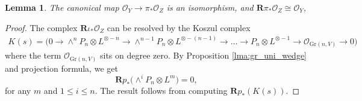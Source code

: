 \documentclass[a4paper]{amsart}
\theoremstyle{plain}
\newtheorem{lemma}[theorem]{Lemma}
\theoremstyle{definition}
\numberwithin{equation}{section}
\newcommand{\Gr}{\mathrm{Gr}}
\newcommand{\SO}{\mathcal{O}}
\begin{document}
\begin{lemma}\label{lma:push-pull-identiy-2}
    The canonical map $\SO_Y \to \pi_*\SO_{Z}$ is an isomorphism, and $\mathbf{R}\pi_* \SO_Z \cong \SO_Y$,
\end{lemma}
\begin{proof} The complex $\mathbf{R}\iota_* \SO_Z$ can be resolved by the Koszul complex
    \[
        \begin{aligned}
            K(s)	=  \big( 0 \to \wedge^{n}{P }_n\otimes L^{\otimes -n}\to \wedge^{n-1}{P }_n\otimes L^{\otimes -(n-1)}   \to \ldots \to {P }_n \otimes L^{\otimes -1} \to {\SO_{\Gr(n,{V })}} \to 0 \big)
        \end{aligned}
    \]
    where the term $\SO_{\Gr(n,{V })}$ sits on degree zero. By Proposition \ref{lma:gr_uni_wedge} and projection formula, we get
    \[
        \mathbf{R}p_*\big(\wedge^{i}{P }_n \otimes L^m\big) = 0,
    \]
    for any $m$ and $ 1\leq  i \leq n$. The result follows from computing $\mathbf{R}p_*(K(s))$.
\end{proof}
\end{document}

